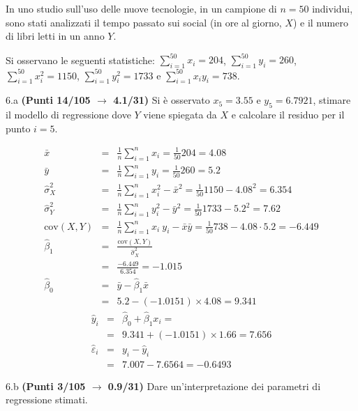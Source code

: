 \documentclass[
  11pt,
]{book}
\theoremstyle{mytheoremstyle}
\theoremstyle{mydefstyle}
\newenvironment{sol}
  {
  \begin{tcolorbox}[enhanced,breakable,arc=0.1mm,boxrule=1pt,colback=white,colframe=iblue,
  title=\bf \fontfamily{lmss}\selectfont \hspace{.5 cm} Soluzione,drop fuzzy shadow]

}{
\end{tcolorbox}
  }
\begin{document}
In uno studio sull'uso delle nuove tecnologie, in un campione di \(n=50\) individui, sono stati analizzati il tempo passato sui social (in ore al giorno, \(X\)) e il numero di libri letti in un anno \(Y\).

Si osservano le seguenti statistiche:
\(\sum_{i=1}^{50}x_i=204\), \(\sum_{i=1}^{50}y_i=260\),
\(\sum_{i=1}^{50}x_i^2=1150\), \(\sum_{i=1}^{50}y_i^2=1733\) e \(\sum_{i=1}^{50}x_iy_i=738\).

6.a \textbf{(Punti 14/105 \(\rightarrow\) 4.1/31)} Si è osservato \(x_5=3.55\) e \(y_5=6.7921\), stimare il modello di regressione dove \(Y\) viene spiegata da \(X\) e calcolare il residuo per il punto \(i=5\).

\begin{sol}
\begin{eqnarray*}
           \bar x &=&\frac 1 n\sum_{i=1}^n x_i = \frac {1}{ 50 }  204 =  4.08 \\
           \bar y &=&\frac 1 n\sum_{i=1}^n y_i = \frac {1}{ 50 }  260 =  5.2 \\
           \hat\sigma_X^2&=&\frac 1 n\sum_{i=1}^n x_i^2-\bar x^2=\frac {1}{ 50 }  1150  - 4.08 ^2= 6.354 \\
           \hat\sigma_Y^2&=&\frac 1 n\sum_{i=1}^n y_i^2-\bar y^2=\frac {1}{ 50 }  1733  - 5.2 ^2= 7.62 \\
           \text{cov}(X,Y)&=&\frac 1 n\sum_{i=1}^n x_i~y_i-\bar x\bar y=\frac {1}{ 50 }  738 - 4.08 \cdot 5.2 = -6.449 \\
           \hat\beta_1 &=& \frac{\text{cov}(X,Y)}{\hat\sigma_X^2} \\
                    &=& \frac{ -6.449 }{ 6.354 }  =  -1.015 \\
           \hat\beta_0 &=& \bar y - \hat\beta_1 \bar x\\
                    &=&  5.2 - (-1.0151) \times  4.08 = 9.341 
         \end{eqnarray*}\begin{eqnarray*}
\hat y_i &=&\hat\beta_0+\hat\beta_1 x_i=\\ 
&=& 9.341 + (-1.0151) \times 1.66 = 7.656 \\ 
\hat \varepsilon_i &=& y_i-\hat y_i\\ 
&=& 7.007 - 7.6564 = -0.6493  
\end{eqnarray*}

\end{sol}

6.b \textbf{(Punti 3/105 \(\rightarrow\) 0.9/31)} Dare un'interpretazione dei parametri di regressione stimati.
\end{document}
